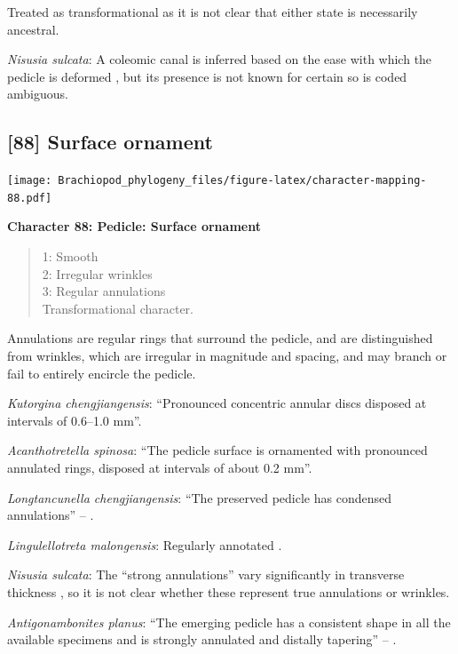 \documentclass[]{book}
\theoremstyle{definition}
\theoremstyle{definition}
\theoremstyle{definition}
\theoremstyle{remark}
\begin{document}
Treated as transformational as it is not clear that either state is
necessarily ancestral.

\emph{Nisusia sulcata}: A coleomic canal is inferred based on the ease
with which the pedicle is deformed
\citep{Holmer2018Evolutionarysignificance}, but its presence is not
known for certain so is coded ambiguous.

\hypertarget{surface-ornament-1}{%
\subsection*{{[}88{]} Surface ornament}\label{surface-ornament-1}}

\texttt{[image: Brachiopod\_phylogeny\_files/figure-latex/character-mapping-88.pdf]}

\textbf{Character 88: Pedicle: Surface ornament}

\begin{quote}
1: Smooth\\
2: Irregular wrinkles\\
3: Regular annulations\\
Transformational character.
\end{quote}

Annulations are regular rings that surround the pedicle, and are
distinguished from wrinkles, which are irregular in magnitude and
spacing, and may branch or fail to entirely encircle the pedicle.

\emph{Kutorgina chengjiangensis}: ``Pronounced concentric annular discs
disposed at intervals of 0.6--1.0 mm''.

\emph{Acanthotretella spinosa}: ``The pedicle surface is ornamented with
pronounced annulated rings, disposed at intervals of about 0.2 mm''.

\emph{Longtancunella chengjiangensis}: ``The preserved pedicle has
condensed annulations'' -- \citet{Zhang2011Theexceptionally}.

\emph{Lingulellotreta malongensis}: Regularly annotated \citep[see fig.
14.9 in][]{Hou2017Brachiopoda}.

\emph{Nisusia sulcata}: The ``strong annulations'' vary significantly in
transverse thickness \citep{Holmer2018Evolutionarysignificance}, so it
is not clear whether these represent true annulations or wrinkles.

\emph{Antigonambonites planus}: ``The emerging pedicle has a consistent
shape in all the available specimens and is strongly annulated and
distally tapering'' -- \citet{Holmer2018Evolutionarysignificance}.
\end{document}
